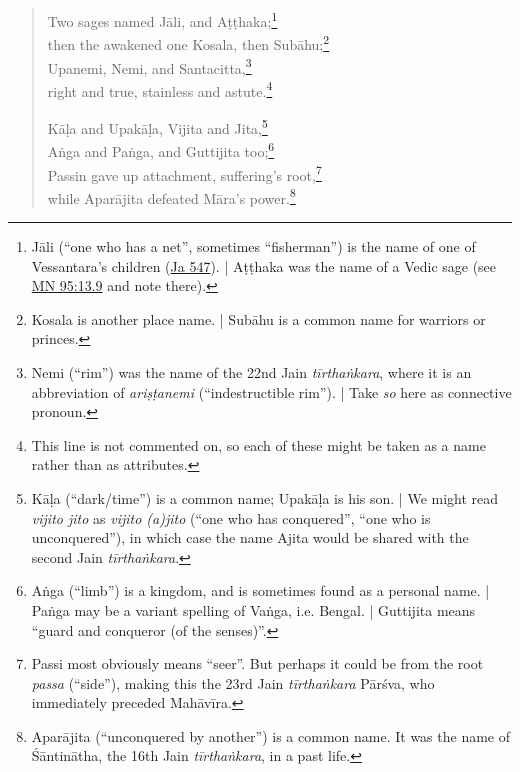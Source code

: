 \documentclass[12pt,openany]{book}%
\begin{document}
\begin{verse}
Two sages named \textsanskrit{Jāli}, and \textsanskrit{Aṭṭhaka};\footnote{\textsanskrit{Jāli} (“one who has a net”, sometimes “fisherman”) is the name of one of Vessantara’s children (\href{https://suttacentral.net/ja547/en/sujato}{Ja 547}). | \textsanskrit{Aṭṭhaka} was the name of a Vedic sage (see \href{https://suttacentral.net/mn95/en/sujato\#13.9}{MN 95:13.9} and note there). } \\
then the awakened one Kosala, then \textsanskrit{Subāhu};\footnote{Kosala is another place name. | \textsanskrit{Subāhu} is a common name for warriors or princes. } \\
Upanemi, Nemi, and Santacitta,\footnote{Nemi (“rim”) was the name of the 22nd Jain \textit{\textsanskrit{tīrthaṅkara}}, where it is an abbreviation of \textit{\textsanskrit{ariṣṭanemi}} (“indestructible rim”). | Take \textit{so} here as connective pronoun. } \\
right and true, stainless and astute.\footnote{This line is not commented on, so each of these might be taken as a name rather than as attributes. } 

\textsanskrit{Kāḷa} and \textsanskrit{Upakāḷa}, Vijita and Jita,\footnote{\textsanskrit{Kāḷa} (“dark/time”) is a common name; \textsanskrit{Upakāḷa} is his son. | We might read \textit{vijito jito} as \textit{vijito (a)jito} (“one who has conquered”, “one who is unconquered”), in which case the name Ajita would be shared with the second Jain \textit{\textsanskrit{tīrthaṅkara}}. } \\
\textsanskrit{Aṅga} and \textsanskrit{Paṅga}, and Guttijita too;\footnote{\textsanskrit{Aṅga} (“limb”) is a kingdom, and is sometimes found as a personal name. | \textsanskrit{Paṅga} may be a variant spelling of \textsanskrit{Vaṅga}, i.e. Bengal. | Guttijita means “guard and conqueror (of the senses)”. } \\
Passin gave up attachment, suffering’s root,\footnote{Passi most obviously means “seer”. But perhaps it could be from the root \textit{passa} (“side”), making this the 23rd Jain \textit{\textsanskrit{tīrthaṅkara}} \textsanskrit{Pārśva}, who immediately preceded \textsanskrit{Mahāvīra}. } \\
while \textsanskrit{Aparājita} defeated \textsanskrit{Māra}’s power.\footnote{\textsanskrit{Aparājita} (“unconquered by another”) is a common name. It was the name of \textsanskrit{Śāntinātha}, the 16th Jain \textit{\textsanskrit{tīrthaṅkara}}, in a past life. } 


\end{verse}
\end{document}
